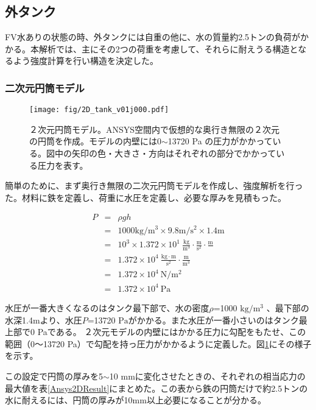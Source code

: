 \documentclass[11pt]{jreport}
\newcommand{\figref}[1]{図\ref{#1}}
\newcommand{\tabref}[1]{表\ref{#1}}
\begin{document}
\subsection{外タンク}
FV水ありの状態の時、外タンクには自重の他に、水の質量約2.5トンの負荷がかかる。本解析では、主にその2つの荷重を考慮して、それらに耐えうる構造となるよう強度計算を行い構造を決定した。

\subsubsection{二次元円筒モデル}

\begin{figure}[htbp]
\centering
\texttt{[image: fig/2D\_tank\_v01j000.pdf]}
\caption[２次元円筒モデル]{２次元円筒モデル。ANSYS空間内で仮想的な奥行き無限の２次元の円筒を作成。モデルの内壁には0$\sim$13720 Pa の圧力がかかっている。図中の矢印の色・大きさ・方向はそれぞれの部分でかかっている圧力を表す。}
\label{Ansys2D}
\end{figure}

簡単のために、まず奥行き無限の二次元円筒モデルを作成し、強度解析を行った。材料に鉄を定義し、荷重に水圧を定義し、必要な厚みを見積もった。

\begin{eqnarray}
P & = & \rho g h\\
& = & 1000 \mathrm{kg/m^{3}} \times 9.8 \mathrm{m/s^{2}} \times 1.4 \mathrm{m}\\
& = & 10^{3} \times 1.372 \times 10^{1}\ \mathrm{\frac{kg}{m^{3}} \cdot \frac{m}{s^{2}} \cdot \frac{m}{}}\\
& = & 1.372 \times 10^{4} \ \mathrm{\frac{kg\cdot m}{s^{2}} \cdot \frac{m}{m^{3}}}\\
& = & 1.372 \times 10^{4} \ \mathrm{N/m^{2}}\\
& = & 1.372 \times 10^{4} \ \mathrm{Pa}
\end{eqnarray}
\fi




水圧が一番大きくなるのはタンク最下部で、水の密度$\rho$=1000 $\mathrm{kg/m^{3}}$ 、最下部の水深1.4mより、水圧$P$=13720 $\mathrm{Pa}$がかかる。また水圧が一番小さいのはタンク最上部で0 Paである。
２次元モデルの内壁にはかかる圧力に勾配をもたせ、この範囲（0〜13720 Pa）で勾配を持っ圧力がかかるように定義した。\figref{Ansys2D}にその様子を示す。

この設定で円筒の厚みを5$\sim$10 mmに変化させたときの、それぞれの相当応力の最大値を\tabref{Ansys2DResult}にまとめた。この表から鉄の円筒だけで約2.5トンの水に耐えるには、円筒の厚みが10mm以上必要になることが分かる。
\end{document}
